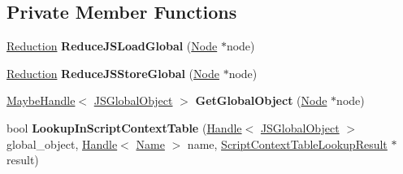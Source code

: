 \subsection*{Private Member Functions}
\begin{DoxyCompactItemize}
\item 
\hyperlink{classv8_1_1internal_1_1compiler_1_1_reduction}{Reduction} {\bfseries Reduce\+J\+S\+Load\+Global} (\hyperlink{classv8_1_1internal_1_1compiler_1_1_node}{Node} $\ast$node)\hypertarget{classv8_1_1internal_1_1compiler_1_1_j_s_global_object_specialization_a52f2248eee541ef1e3889566dda1d052}{}\label{classv8_1_1internal_1_1compiler_1_1_j_s_global_object_specialization_a52f2248eee541ef1e3889566dda1d052}

\item 
\hyperlink{classv8_1_1internal_1_1compiler_1_1_reduction}{Reduction} {\bfseries Reduce\+J\+S\+Store\+Global} (\hyperlink{classv8_1_1internal_1_1compiler_1_1_node}{Node} $\ast$node)\hypertarget{classv8_1_1internal_1_1compiler_1_1_j_s_global_object_specialization_a00e33416605beda2d15195ce320712f4}{}\label{classv8_1_1internal_1_1compiler_1_1_j_s_global_object_specialization_a00e33416605beda2d15195ce320712f4}

\item 
\hyperlink{classv8_1_1internal_1_1_maybe_handle}{Maybe\+Handle}$<$ \hyperlink{classv8_1_1internal_1_1_j_s_global_object}{J\+S\+Global\+Object} $>$ {\bfseries Get\+Global\+Object} (\hyperlink{classv8_1_1internal_1_1compiler_1_1_node}{Node} $\ast$node)\hypertarget{classv8_1_1internal_1_1compiler_1_1_j_s_global_object_specialization_a50824640a54c1b6bb67f4e739087a7f3}{}\label{classv8_1_1internal_1_1compiler_1_1_j_s_global_object_specialization_a50824640a54c1b6bb67f4e739087a7f3}

\item 
bool {\bfseries Lookup\+In\+Script\+Context\+Table} (\hyperlink{classv8_1_1internal_1_1_handle}{Handle}$<$ \hyperlink{classv8_1_1internal_1_1_j_s_global_object}{J\+S\+Global\+Object} $>$ global\+\_\+object, \hyperlink{classv8_1_1internal_1_1_handle}{Handle}$<$ \hyperlink{classv8_1_1internal_1_1_name}{Name} $>$ name, \hyperlink{structv8_1_1internal_1_1compiler_1_1_j_s_global_object_specialization_1_1_script_context_table_lookup_result}{Script\+Context\+Table\+Lookup\+Result} $\ast$result)\hypertarget{classv8_1_1internal_1_1compiler_1_1_j_s_global_object_specialization_a7d5079e0fb083f51dc371f177637e621}{}\label{classv8_1_1internal_1_1compiler_1_1_j_s_global_object_specialization_a7d5079e0fb083f51dc371f177637e621}


\end{DoxyCompactItemize}
